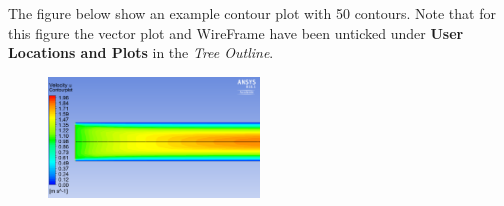 \documentclass[11pt,a4paper,oneside]{scrartcl}
\newcommand\bfr[1]{\textcolor[rgb]{1,0.00,0.00}{\textbf{\textsf{#1}}}}
\begin{document}
The figure below show an example contour plot with 50 contours. Note that for this figure the vector plot and WireFrame have been unticked under \bfr{User Locations and Plots} in the \emph{Tree Outline}.

\begin{figure}[H]
\begin{center}
\includegraphics[width=0.5\textwidth,clip]{velocity_contour.png}
\end{center}
\end{figure}
\end{document}
